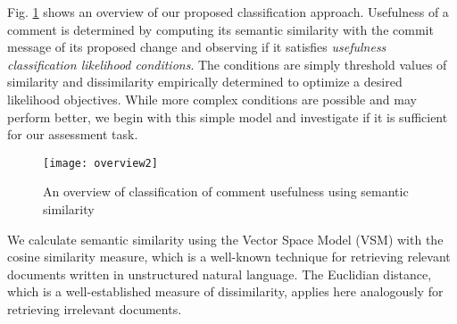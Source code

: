 Fig. \ref{fig:overview} shows an overview of our proposed classification approach.
Usefulness of a comment is determined by computing its semantic similarity with the commit message of its proposed change and observing if it satisfies \emph{usefulness classification likelihood conditions}.
The conditions are simply threshold values of similarity and dissimilarity empirically determined to optimize a desired likelihood objectives. While more complex conditions are possible and may perform better, we begin with this simple model and investigate if it is sufficient for our assessment task.


\begin{figure}[!t]
\centering
\texttt{[image: overview2]}
\caption{An overview of classification of comment usefulness using semantic similarity}
\label{fig:overview}
\end{figure}

We calculate semantic similarity using the Vector Space Model (VSM) %
with the cosine similarity measure, which is a well-known technique for retrieving relevant documents written in unstructured natural language. The Euclidian distance, which is a well-established measure of dissimilarity,  applies here analogously for retrieving irrelevant documents.

